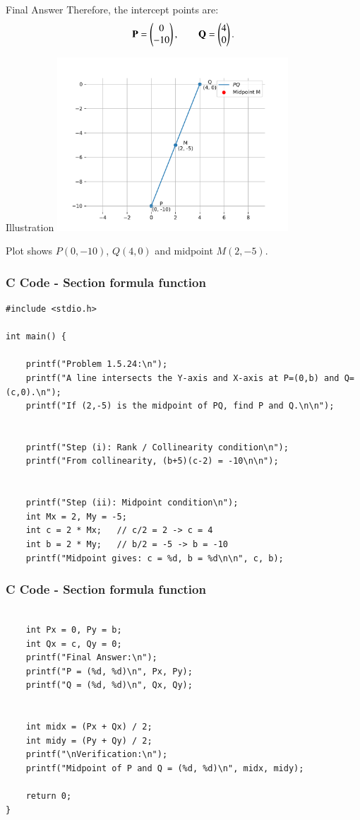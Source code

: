 \documentclass{beamer}
\begin{document}
\begin{frame}{Final Answer}
Therefore, the intercept points are:
\[
\mathbf P = \begin{pmatrix}0 \\ -10\end{pmatrix}, 
\qquad 
\mathbf Q = \begin{pmatrix}4 \\ 0\end{pmatrix}.
\]
\end{frame}


\begin{frame}{Illustration}
\centering
\includegraphics[width=0.65\textwidth]{figs/fig.png}

\bigskip
Plot shows \(P(0,-10)\), \(Q(4,0)\) and midpoint \(M(2,-5)\).
\end{frame}




\begin{frame}[fragile]
\frametitle{C Code - Section formula function}
\begin{lstlisting}
#include <stdio.h>

int main() {
 
    printf("Problem 1.5.24:\n");
    printf("A line intersects the Y-axis and X-axis at P=(0,b) and Q=(c,0).\n");
    printf("If (2,-5) is the midpoint of PQ, find P and Q.\n\n");

   
    printf("Step (i): Rank / Collinearity condition\n");
    printf("From collinearity, (b+5)(c-2) = -10\n\n");

 
    printf("Step (ii): Midpoint condition\n");
    int Mx = 2, My = -5;
    int c = 2 * Mx;   // c/2 = 2 -> c = 4
    int b = 2 * My;   // b/2 = -5 -> b = -10
    printf("Midpoint gives: c = %d, b = %d\n\n", c, b);
    \end{lstlisting}
\end{frame}

\begin{frame}[fragile]
\frametitle{C Code - Section formula function}
\begin{lstlisting}

    int Px = 0, Py = b;
    int Qx = c, Qy = 0;
    printf("Final Answer:\n");
    printf("P = (%d, %d)\n", Px, Py);
    printf("Q = (%d, %d)\n", Qx, Qy);

  
    int midx = (Px + Qx) / 2;
    int midy = (Py + Qy) / 2;
    printf("\nVerification:\n");
    printf("Midpoint of P and Q = (%d, %d)\n", midx, midy);

    return 0;
}
\end{lstlisting}
\end{frame}
\end{document}
